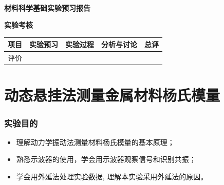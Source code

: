 \documentclass[a4paper,utf8]{article}
\begin{document}
\begin{center}
    {\mbox{}\\[7em]\bfseries\songti%
    材料科学基础实验预习报告}\\[34mm]
    {\bfseries\songti
    实验考核\\[3mm]
    \extrarowheight=3mm
    \begin{tabularx}{150mm}{|X|X|X|X|X|}\hline
        \hfil 项目 \hfil  & \hfil 实验预习 \hfil & \hfil 实验过程 \hfil & \hfil 分析与讨论 \hfil & \hfil 总评 \hfil \\[3mm] \hline
        \hfil 评价 \hfil &  &  &  &  \\[3mm] \hline
    \end{tabularx}
    }
\end{center}
\newpage
\part{动态悬挂法测量金属材料杨氏模量}
\section{实验目的}
    \begin{itemize}
        \item 理解动力学振动法测量材料杨氏模量的基本原理；
        \item 熟悉示波器的使用，学会用示波器观察信号和识别共振； 
        \item 学会用外延法处理实验数据, 理解本实验采用外延法的原因。
    \end{itemize}
\end{document}
